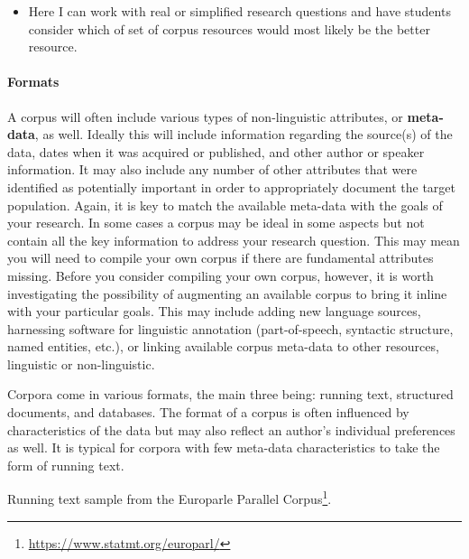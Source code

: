 \documentclass[
]{article}
\DeclareRobustCommand{\href}[2]{#2\footnote{\url{#1}}}
\newenvironment{rmdblock}[1]
  {\begin{shaded*}
  \begin{itemize}
  \renewcommand{\labelitemi}{
    \raisebox{-.5\height}[0pt][0pt]{
      {\setkeys{Gin}{width=2em,keepaspectratio}\texttt{[image: assets/images/\#1]}}
    }
  }
  \item
  }
  {
  \end{itemize}
  \end{shaded*}
  }
\newenvironment{rmdnote}
  {\begin{rmdblock}{note}}
  {\end{rmdblock}}
\begin{document}
\begin{rmdnote}
Here I can work with real or simplified research questions and have
students consider which of set of corpus resources would most likely be
the better resource.
\end{rmdnote}

\hypertarget{formats}{%
\paragraph{Formats}\label{formats}}

A corpus will often include various types of non-linguistic attributes, or \textbf{meta-data}, as well. Ideally this will include information regarding the source(s) of the data, dates when it was acquired or published, and other author or speaker information. It may also include any number of other attributes that were identified as potentially important in order to appropriately document the target population. Again, it is key to match the available meta-data with the goals of your research. In some cases a corpus may be ideal in some aspects but not contain all the key information to address your research question. This may mean you will need to compile your own corpus if there are fundamental attributes missing. Before you consider compiling your own corpus, however, it is worth investigating the possibility of augmenting an available corpus to bring it inline with your particular goals. This may include adding new language sources, harnessing software for linguistic annotation (part-of-speech, syntactic structure, named entities, etc.), or linking available corpus meta-data to other resources, linguistic or non-linguistic.

Corpora come in various formats, the main three being: running text, structured documents, and databases. The format of a corpus is often influenced by characteristics of the data but may also reflect an author's individual preferences as well. It is typical for corpora with few meta-data characteristics to take the form of running text.

Running text sample from the \href{https://www.statmt.org/europarl/}{Europarle Parallel Corpus}.
\end{document}

